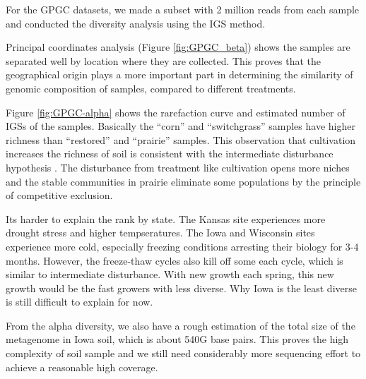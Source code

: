 \documentclass{article}
\begin{document}
For the GPGC datasets, we made a subset with 2 million reads from each sample 
and conducted the diversity analysis using the IGS method. 

Principal coordinates analysis (Figure \ref{fig:GPGC_beta}) shows the samples are 
separated well by location where they are collected.%
This proves that the geographical origin plays a more important part in 
determining the similarity of genomic composition of samples, compared to 
different treatments.

Figure \ref{fig:GPGC-alpha} shows the rarefaction curve and estimated number 
of IGSs of the samples. Basically the ``corn'' and ``switchgrass'' samples
have higher richness than ``restored'' and ``prairie'' samples. This observation 
that cultivation increases the richness of soil 
is consistent with the intermediate disturbance hypothesis \cite{wilkinson1999disturbing}. The disturbance 
from treatment like cultivation opens more niches and the stable 
communities in prairie eliminate some populations by the principle of 
competitive exclusion.

Its harder to explain the rank by state. 
The Kansas site experiences more drought stress and higher tempseratures. 
The Iowa and 
Wisconsin sites experience more cold, especially freezing conditions arresting 
their biology for 3-4 months. However, the freeze-thaw cycles also kill off 
some each cycle, which is similar to intermediate disturbance. With new 
growth each spring, this new growth would be the fast growers with 
less diverse. Why Iowa is the least diverse is still difficult to explain for now.

 From the alpha diversity, we also have a rough estimation of the total 
 size of the metagenome in Iowa soil, which is about 540G base pairs. This 
 proves the high complexity of soil sample and we still need considerably more sequencing 
 effort to achieve a reasonable high coverage.
 
\end{document}

